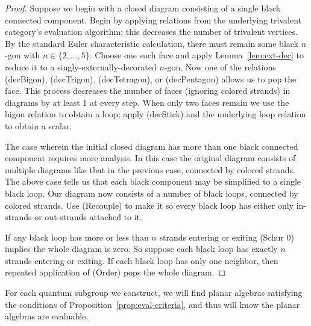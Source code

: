\begin{proof}
    Suppose we begin with a closed diagram consisting of a single black connected component.
    Begin by applying relations from the underlying trivalent category's evaluation algorithm; this decreases the number of trivalent vertices.
    By the standard Euler characteristic calculation, there must remain some black $n$-gon with $n\in\{ 2,\dots,5 \}$.
    Choose one such face and apply Lemma~\ref{lem:ext-dec} to reduce it to a singly-externally-decorated $n$-gon.
    Now one of the relations (decBigon), (decTrigon), (decTetragon), or (decPentagon) allows us to pop the face.
    This process decreases the number of faces (ignoring colored strands) in diagrams by at least 1 at every step.
    When only two faces remain we use the bigon relation to obtain a loop; apply (decStick) and the underlying loop relation to obtain a scalar.
    
    The case wherein the initial closed diagram has more than one black connected component requires more analysis.
    In this case the original diagram consists of multiple diagrams like that in the previous case, connected by colored strands.
    The above case tells us that each black component may be simplified to a single black loop.
    Our diagram now consists of a number of black loops, connected by colored strands.
    Use (Recouple) to make it so every black loop has either only in-strands or out-strands attached to it.
    
    If any black loop has more or less than $n$ strands entering or exiting (Schur 0) implies the whole diagram is zero.
    So suppose each black loop has exactly $n$ strands entering or exiting.
    If each black loop has only one neighbor, then repeated application of (Order) pops the whole diagram.

\end{proof}

For each quantum subgroup we construct, we will find planar algebras satisfying the conditions of Proposition~\ref{prop:eval-criteria}, and thus will know the planar algebras are evaluable. 



